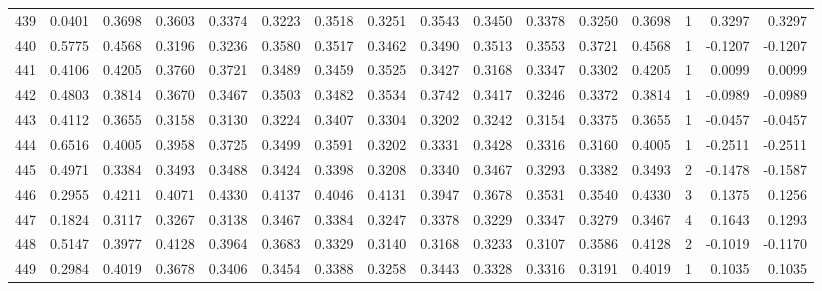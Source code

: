 \begin{tabular}{lrrrrrrrrrrrrrrr}
439 &      0.0401 &  0.3698 &  0.3603 &  0.3374 &  0.3223 &  0.3518 &  0.3251 &  0.3543 &  0.3450 &  0.3378 &   0.3250 &     0.3698 &      1 &                    0.3297 &                     0.3297 \\
440 &      0.5775 &  0.4568 &  0.3196 &  0.3236 &  0.3580 &  0.3517 &  0.3462 &  0.3490 &  0.3513 &  0.3553 &   0.3721 &     0.4568 &      1 &                   -0.1207 &                    -0.1207 \\
441 &      0.4106 &  0.4205 &  0.3760 &  0.3721 &  0.3489 &  0.3459 &  0.3525 &  0.3427 &  0.3168 &  0.3347 &   0.3302 &     0.4205 &      1 &                    0.0099 &                     0.0099 \\
442 &      0.4803 &  0.3814 &  0.3670 &  0.3467 &  0.3503 &  0.3482 &  0.3534 &  0.3742 &  0.3417 &  0.3246 &   0.3372 &     0.3814 &      1 &                   -0.0989 &                    -0.0989 \\
443 &      0.4112 &  0.3655 &  0.3158 &  0.3130 &  0.3224 &  0.3407 &  0.3304 &  0.3202 &  0.3242 &  0.3154 &   0.3375 &     0.3655 &      1 &                   -0.0457 &                    -0.0457 \\
444 &      0.6516 &  0.4005 &  0.3958 &  0.3725 &  0.3499 &  0.3591 &  0.3202 &  0.3331 &  0.3428 &  0.3316 &   0.3160 &     0.4005 &      1 &                   -0.2511 &                    -0.2511 \\
445 &      0.4971 &  0.3384 &  0.3493 &  0.3488 &  0.3424 &  0.3398 &  0.3208 &  0.3340 &  0.3467 &  0.3293 &   0.3382 &     0.3493 &      2 &                   -0.1478 &                    -0.1587 \\
446 &      0.2955 &  0.4211 &  0.4071 &  0.4330 &  0.4137 &  0.4046 &  0.4131 &  0.3947 &  0.3678 &  0.3531 &   0.3540 &     0.4330 &      3 &                    0.1375 &                     0.1256 \\
447 &      0.1824 &  0.3117 &  0.3267 &  0.3138 &  0.3467 &  0.3384 &  0.3247 &  0.3378 &  0.3229 &  0.3347 &   0.3279 &     0.3467 &      4 &                    0.1643 &                     0.1293 \\
448 &      0.5147 &  0.3977 &  0.4128 &  0.3964 &  0.3683 &  0.3329 &  0.3140 &  0.3168 &  0.3233 &  0.3107 &   0.3586 &     0.4128 &      2 &                   -0.1019 &                    -0.1170 \\
449 &      0.2984 &  0.4019 &  0.3678 &  0.3406 &  0.3454 &  0.3388 &  0.3258 &  0.3443 &  0.3328 &  0.3316 &   0.3191 &     0.4019 &      1 &                    0.1035 &                     0.1035 \\

\end{tabular}
